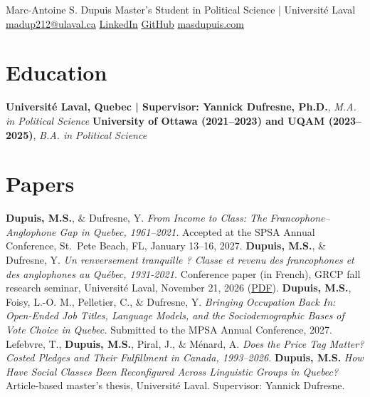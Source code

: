 \documentclass[10pt,letterpaper]{article}
\begin{document}
\cvheader
  {Marc-Antoine S. Dupuis}
  {Master's Student in Political Science | Université Laval}
  {\href{mailto:madup212@ulaval.ca}{madup212@ulaval.ca}\cvsep
   \href{https://www.linkedin.com/in/marc-antoine-dupuis-a6a069233/}{LinkedIn}\cvsep
   \href{https://github.com/MADUP212}{GitHub}\cvsep
   \href{https://www.masdupuis.com/}{masdupuis.com}}

\section*{Education}
  {\textbf{Université Laval, Quebec | Supervisor: Yannick Dufresne, Ph.D.}, \textit{M.A. in Political Science}}{}
  {\textbf{University of Ottawa (2021--2023) and UQAM (2023--2025)}, \textit{B.A. in Political Science}}{}

\section*{Papers}
  {\textbf{Dupuis, M.S.}, \& Dufresne, Y. \textit{From Income to Class: The Francophone--Anglophone Gap
   in Quebec, 1961--2021.}}
  {Accepted at the SPSA Annual Conference, St.\ Pete Beach, FL, January 13--16, 2027.}
  {\textbf{Dupuis, M.S.}, \& Dufresne, Y. \textit{Un renversement tranquille ? Classe et revenu des francophones et des anglophones au Québec, 1931-2021.}}
  {Conference paper (in French), GRCP fall research seminar, Université Laval, November 21, 2026 (\href{https://www.masdupuis.com/papers/du-revenu-a-la-classe.pdf}{PDF}).}
  {\textbf{Dupuis, M.S.}, Foisy, L.-O. M., Pelletier, C., \& Dufresne, Y. \textit{Bringing Occupation
   Back In: Open-Ended Job Titles, Language Models, and the Sociodemographic Bases of Vote Choice in Quebec.}}
  {Submitted to the MPSA Annual Conference, 2027.}
  {Lefebvre, T., \textbf{Dupuis, M.S.}, Piral, J., \& Ménard, A. \textit{Does the Price Tag Matter?
   Costed Pledges and Their Fulfillment in Canada, 1993--2026.}}{}
  {\textbf{Dupuis, M.S.} \textit{How Have Social Classes Been Reconfigured Across Linguistic Groups
   in Quebec?}}
  {Article-based master's thesis, Université Laval. Supervisor: Yannick Dufresne.}
\end{document}
